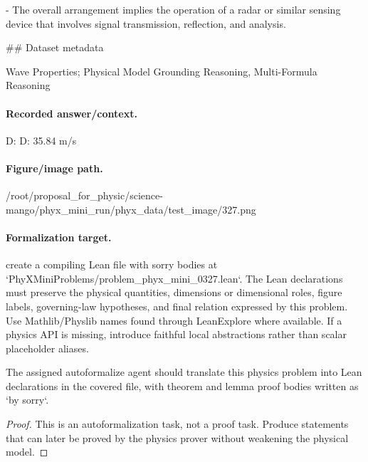 - The overall arrangement implies the operation of a radar or similar sensing device that involves signal transmission, reflection, and analysis.

\#\# Dataset metadata

Wave Properties; Physical Model Grounding Reasoning, Multi-Formula Reasoning

\paragraph{Recorded answer/context.}
D: D: 35.84 m/s

\paragraph{Figure/image path.}
/root/proposal\_for\_physic/science-mango/phyx\_mini\_run/phyx\_data/test\_image/327.png

\paragraph{Formalization target.}
create a compiling Lean file with sorry bodies at `PhyXMiniProblems/problem\_phyx\_mini\_0327.lean`. The Lean declarations must preserve the physical quantities, dimensions or dimensional roles, figure labels, governing-law hypotheses, and final relation expressed by this problem.
Use Mathlib/Physlib names found through LeanExplore where available. If a physics API is missing, introduce faithful local abstractions rather than scalar placeholder aliases.

\begin{theorem}
\label{thm:physics:phyx_mini_0327:target}
The assigned autoformalize agent should translate this physics problem into Lean declarations in the covered file, with theorem and lemma proof bodies written as `by sorry`.
\end{theorem}
\begin{proof}
This is an autoformalization task, not a proof task. Produce statements that can later be proved by the physics prover without weakening the physical model.
\end{proof}

